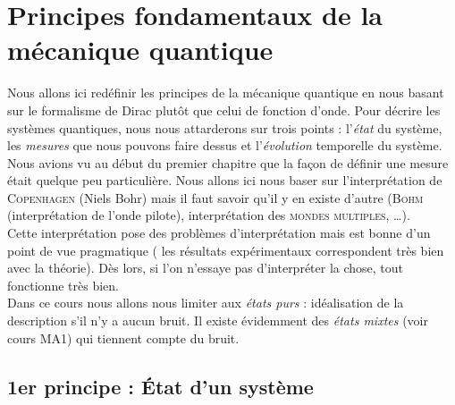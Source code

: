 \chapter{Principes fondamentaux de la mécanique quantique}

 Nous allons ici redéfinir les principes de la mécanique quantique en nous basant 
 sur le formalisme de Dirac plutôt que celui de fonction d'onde.
 Pour décrire les systèmes quantiques, nous nous attarderons sur trois points :
 l'\textit{état} du système, les \textit{mesures} que nous pouvons faire dessus et
 l'\textit{évolution} temporelle du système.
  Nous avions vu au début du premier chapitre 
 que la façon de définir une mesure était quelque peu particulière. Nous 
 allons ici nous baser sur l'interprétation de \textsc{Copenhagen} (Niels Bohr) mais 
 il faut savoir qu'il y en existe d'autre (\textsc{Bohm} (interprétation de l'onde 
 pilote), interprétation des \textsc{mondes multiples}, \dots).\\

  Cette interprétation 
 pose des  problèmes d'interprétation mais est bonne d'un point de vue pragmatique (
 les résultats expérimentaux correspondent très bien avec la théorie). Dès lors, si 
 l'on n'essaye pas d'interpréter la chose, tout fonctionne très bien.\\
 
 Dans ce cours nous allons nous limiter aux \textit{états purs} : idéalisation 
 de la description s'il n'y a aucun bruit. Il existe évidemment des 
 \textit{états mixtes} (voir cours MA1) qui tiennent compte du bruit. 
 
 \section{1er principe : État d'un système}
